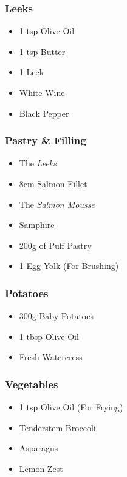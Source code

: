 \documentclass[11pt, english]{article}
\begin{document}
		\subsubsection*{Leeks}

	\begin{itemize}
        \setlength\itemsep{0cm}
		\item 1 tsp Olive Oil
		\item 1 tsp Butter
		\item 1 Leek
		\item White Wine
		\item Black Pepper
        \end{itemize}

		\subsubsection*{Pastry \& Filling}

	\begin{itemize}
        \setlength\itemsep{0cm}
		\item The \textit{Leeks}
		\item 8cm Salmon Fillet
		\item The \textit{Salmon Mousse}
		\item Samphire
		\item 200g of Puff Pastry
		\item 1 Egg Yolk (For Brushing)
        \end{itemize}

		\subsubsection*{Potatoes}

	\begin{itemize}
        \setlength\itemsep{0cm}
		\item 300g Baby Potatoes
		\item 1 tbsp Olive Oil
		\item Fresh Watercress
        \end{itemize}

		\subsubsection*{Vegetables}

	\begin{itemize}
        \setlength\itemsep{0cm}
		\item 1 tsp Olive Oil (For Frying)
		\item Tenderstem Broccoli
		\item Asparagus
		\item Lemon Zest
        \end{itemize}
\end{document}
